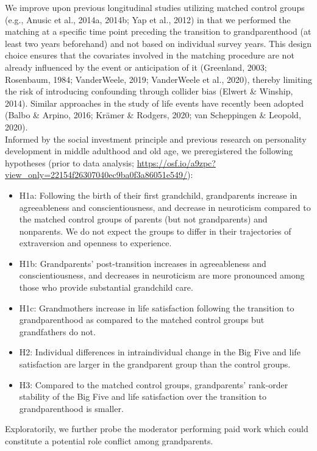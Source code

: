 \documentclass[
  english,
  man, noextraspace]{apa7}
\providecommand{\tightlist}{%
  \setlength{\itemsep}{0pt}\setlength{\parskip}{0pt}}
\begin{document}
We improve upon previous longitudinal studies utilizing matched control groups (e.g., Anusic et al., 2014a, 2014b; Yap et al., 2012) in that we performed the matching at a specific time point preceding the transition to grandparenthood (at least two years beforehand) and not based on individual survey years. This design choice ensures that the covariates involved in the matching procedure are not already influenced by the event or anticipation of it (Greenland, 2003; Rosenbaum, 1984; VanderWeele, 2019; VanderWeele et al., 2020), thereby limiting the risk of introducing confounding through collider bias (Elwert \& Winship, 2014). Similar approaches in the study of life events have recently been adopted (Balbo \& Arpino, 2016; Krämer \& Rodgers, 2020; van Scheppingen \& Leopold, 2020).\\
Informed by the social investment principle and previous research on personality development in middle adulthood and old age, we preregistered the following hypotheses (prior to data analysis; \url{https://osf.io/a9zpc?view_only=22154f26307040ec9ba0f3a86051e549/}):

\begin{itemize}
\tightlist
\item
  H1a: Following the birth of their first grandchild, grandparents increase in agreeableness and conscientiousness, and decrease in neuroticism compared to the matched control groups of parents (but not grandparents) and nonparents. We do not expect the groups to differ in their trajectories of extraversion and openness to experience.
\item
  H1b: Grandparents' post-transition increases in agreeableness and conscientiousness, and decreases in neuroticism are more pronounced among those who provide substantial grandchild care.
\item
  H1c: Grandmothers increase in life satisfaction following the transition to grandparenthood as compared to the matched control groups but grandfathers do not.
\item
  H2: Individual differences in intraindividual change in the Big Five and life satisfaction are larger in the grandparent group than the control groups.
\item
  H3: Compared to the matched control groups, grandparents' rank-order stability of the Big Five and life satisfaction over the transition to grandparenthood is smaller.
\end{itemize}

Exploratorily, we further probe the moderator performing paid work which could constitute a potential role conflict among grandparents.
\end{document}
